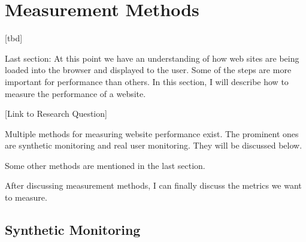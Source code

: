

\section{Measurement Methods}


[tbd]



Last section: At this point we have an understanding of how web sites are being loaded into the browser and displayed to the user.
Some of the steps are more important for performance than others.
In this section, I will describe how to measure the performance of a website.


[Link to Research Question]




Multiple methods for measuring website performance exist.
The prominent ones are synthetic monitoring and real user monitoring.
They will be discussed below.

Some other methods are mentioned in the last section.

After discussing measurement methods, I can finally discuss the metrics we want to measure.







\subsection{Synthetic Monitoring}


